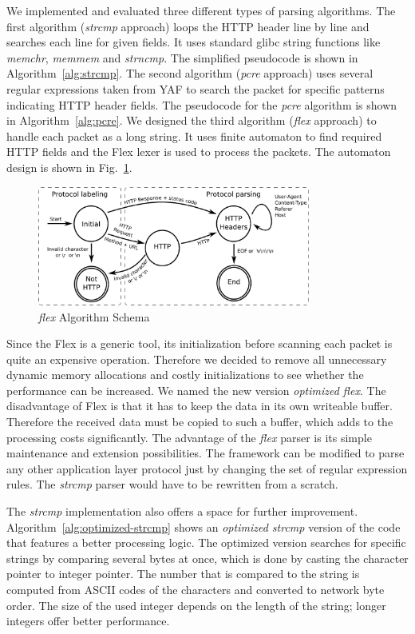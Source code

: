 We implemented and evaluated three different types of parsing algorithms. The first algorithm (\emph{strcmp} approach) loops the HTTP header line by line and searches each line for given fields. It uses standard glibc string functions like \emph{memchr}, \emph{memmem} and \emph{strncmp}. The simplified pseudocode is shown in Algorithm~\ref{alg:strcmp}. The second algorithm (\emph{pcre} approach) uses several regular expressions taken from YAF to search the packet for specific patterns indicating HTTP header fields. The pseudocode for the \emph{pcre} algorithm is shown in Algorithm~\ref{alg:pcre}. We designed the third algorithm (\emph{flex} approach) to handle each packet as a long string. It uses finite automaton to find required HTTP fields and the Flex lexer is used to process the packets. The automaton design is shown in Fig.~\ref{fig:flex_schema}.

\begin{figure}[t]
        \centering
        \includegraphics[width=0.8\textwidth]{figures/paper-http/flex_schema}
        \caption{\emph{flex} Algorithm Schema}
        \label{fig:flex_schema}
\end{figure}

Since the Flex is a generic tool, its initialization before scanning each packet is quite an expensive operation. Therefore we decided to remove all unnecessary dynamic memory allocations and costly initializations to see whether the performance can be increased. We named the new version \emph{optimized flex}. The disadvantage of Flex is that it has to keep the data in its own writeable buffer. Therefore the received data must be copied to such a buffer, which adds to the processing costs significantly. The advantage of the \emph{flex} parser is its simple maintenance and extension possibilities. The framework can be modified to parse any other application layer protocol just by changing the set of regular expression rules. The \emph{strcmp} parser would have to be rewritten from a scratch.

The \emph{strcmp} implementation also offers a space for further improvement. Algorithm~\ref{alg:optimized-strcmp} shows an \emph{optimized strcmp} version of the code that features a better processing logic. The optimized version searches for specific strings by comparing several bytes at once, which is done by casting the character pointer to integer pointer. The number that is compared to the string is computed from ASCII codes of the characters and converted to network byte order. The size of the used integer depends on the length of the string; longer integers offer better performance.

